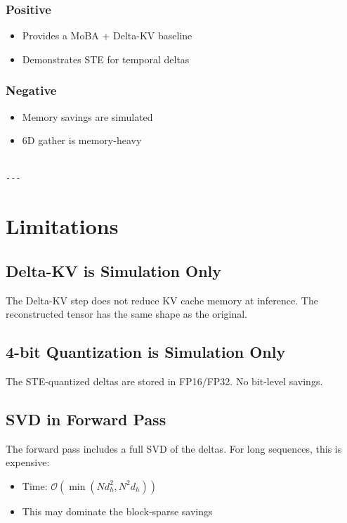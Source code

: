 \subsubsection{Positive}
\begin{itemize}
\item Provides a MoBA + Delta-KV baseline
\item Demonstrates STE for temporal deltas

\end{itemize}
\subsubsection{Negative}
\begin{itemize}
\item Memory savings are simulated
\item 6D gather is memory-heavy
\end{itemize}
\begin{lstlisting}

---
\end{lstlisting}

\section{Limitations}

\subsection{Delta-KV is Simulation Only}

The Delta-KV step does not reduce KV cache memory at inference. The 
reconstructed tensor has the same shape as the original.

\subsection{4-bit Quantization is Simulation Only}

The STE-quantized deltas are stored in FP16/FP32. No bit-level savings.

\subsection{SVD in Forward Pass}

The forward pass includes a full SVD of the deltas. For long sequences, 
this is expensive:
\begin{itemize}
\item Time: $\mathcal{O}(\min(N d_h^2, N^2 d_h))$
\item This may dominate the block-sparse savings

\end{itemize}

